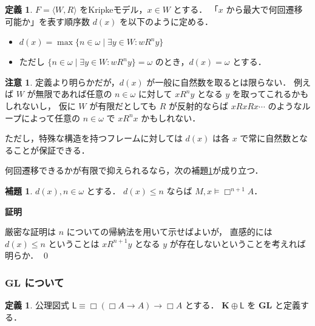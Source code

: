 \documentclass{jsarticle}
\makeatletter
\newcommand*{\Ax}[1]{\mathsf{#1}}
\newcommand*{\AxL}{\Ax{L}}
\newcommand*{\Logic}[1]{\mathbf{#1}}
\newcommand*{\LogicK}{\Logic{K}}
\newcommand*{\LogicGL}{\Logic{GL}}
\newcommand*{\structure}[1]{\langle #1 \rangle}
\theoremstyle{definition}
\newtheorem{lemma}[theorem]{補題}
\newtheorem{definition}[theorem]{定義}
\newtheorem{remark}[theorem]{注意}
\renewcommand{\proofname}{証明}
\renewenvironment{proof}[1][\proofname]{\par
    \normalfont 
    \topsep6\p@\@plus6\p@\relax
    \trivlist
    \item\relax
    {\bfseries\gtfamily
    #1\@addpunct{.}}\hspace\labelsep\ignorespaces
    }{%
    \endtrivlist
    \@endpefalse
}
\makeatother
\begin{document}
\begin{definition}
	$F = \structure{W, R}$ をKripkeモデル，$x \in W$ とする．
	「$x$ から最大で何回遷移可能か」を表す順序数 $d(x)$ を以下のように定める．
	\begin{itemize}
		\item $d(x) = \max \{ n \in \omega \mid \exists y \in W \colon w R^n y \}$
		\item ただし $\{ n \in \omega \mid \exists y \in W \colon w R^n y \} = \omega$ のとき，$d(x) = \omega$ とする．
	\end{itemize}
\end{definition}

\begin{remark}
	定義より明らかだが，$d(x)$ が一般に自然数を取るとは限らない．
	例えば $W$ が無限であれば任意の $n \in \omega$ に対して $x R^n y$ となる $y$ を取ってこれるかもしれないし，
	仮に $W$ が有限だとしても $R$ が反射的ならば $x R x R x \cdots$ のようなループによって任意の $n \in \omega$ で $x R^n x$ かもしれない．

	ただし，特殊な構造を持つフレームに対しては $d(x)$ は各 $x$ で常に自然数となることが保証できる．
\end{remark}

何回遷移できるかが有限で抑えられるなら，次の補題\ref{lem:cannot_access}が成り立つ．

\begin{lemma}\label{lem:cannot_access}
	$d(x), n \in \omega$ とする．
	$d(x) \leq n$ ならば $M,x \vDash \Box^{n + 1} A$．
\end{lemma}

\begin{proof}
	厳密な証明は $n$ についての帰納法を用いて示せばよいが，
	直感的には $d(x) \leq n$ ということは $x R^{n + 1} y$ となる $y$ が存在しないということを考えれば明らか．
	\qed
\end{proof}

\subsubsection{$\LogicGL$ について}

\begin{definition}
	公理図式 $\AxL \equiv \Box(\Box A \to A) \to \Box A$ とする．\index{$\AxL$}
	$\LogicK \oplus \AxL$ を $\LogicGL$ と定義する．\index{$\LogicGL$}
\end{definition}
\end{document}
